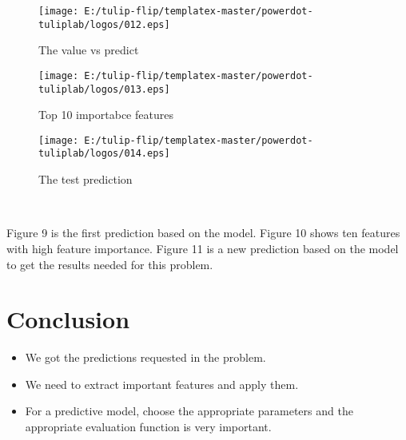 \begin{figure}[htbp]
	\centering
	
  \texttt{[image: E:/tulip-flip/templatex-master/powerdot-tuliplab/logos/012.eps]}
	\caption{  The value vs predict}\label{fig:008.eps}
\end{figure}

\begin{figure}[htbp]
	\centering
	
  \texttt{[image: E:/tulip-flip/templatex-master/powerdot-tuliplab/logos/013.eps]}
	\caption{Top 10 importabce features }\label{fig:009.eps}
\end{figure}

\begin{figure}[htbp]
	\centering
	
  \texttt{[image: E:/tulip-flip/templatex-master/powerdot-tuliplab/logos/014.eps]}
	\caption{ The test prediction }\label{fig:010.eps}
\end{figure}
\ 

Figure 9 is the first prediction based on the model. Figure 10 
shows ten features with high feature importance. Figure 11 is a new
prediction based on the model to get the results needed for this problem.

\section{Conclusion}
\begin{itemize}
 \item We got the predictions requested in the problem.
 \item We need to extract important features and apply them.
 \item For a predictive model, choose the appropriate parameters and the 
 appropriate evaluation function is very important.
\end{itemize}






